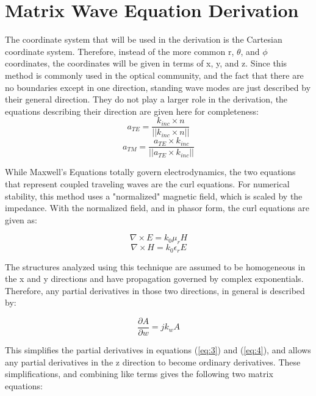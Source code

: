 \section{Matrix Wave Equation Derivation}\label{sec:wave}
The coordinate system that will be used in the derivation is the Cartesian 
coordinate system.  Therefore, instead of the more common r, $\theta$, and 
$\phi$ coordinates, the coordinates will be given in terms of x, y, and z.  
Since this method is commonly used in the optical community, and the fact that 
there are no boundaries except in one direction, standing wave modes are just 
described by their general direction.  They do not play a larger role in the 
derivation, the equations describing their direction are given here for 
completeness:
\begin{equation}
a_{TE} = \frac{k_{inc} \times n}{|| {k_{inc} \times n ||} }
\label{eq:1}
\end{equation}
\begin{equation}
a_{TM} = \frac{ a_{TE} \times k_{inc} } {|| a_{TE} \times k_{inc} || }
\label{eq:2}
\end{equation}

 While Maxwell’s Equations totally govern electrodynamics, the two equations 
 that represent coupled traveling waves are the curl equations.  For numerical 
 stability, this method uses a "normalized" magnetic field, which is scaled by 
 the impedance.  With the normalized field, and in phasor form, the curl 
 equations are given as: 

 \begin{equation}
 \nabla \times E = k_0 \mu_r H
 \label{eq:3}
 \end{equation}
 \begin{equation}
 \nabla \times H = k_0 \epsilon_r E
 \label{eq:4}
 \end{equation}

  The structures analyzed using this technique are assumed to be homogeneous in 
  the x and y directions and have propagation governed by complex exponentials.  
  Therefore, any partial derivatives in those two directions, in general is 
  described by: 

  \begin{equation}
  \frac{\partial A}{\partial w} = j k_w A
  \label{eq:5}
  \end{equation}

   This simplifies the partial derivatives in equations (\ref{eq:3}) and 
   (\ref{eq:4}), and allows any partial derivatives in the z direction to 
   become ordinary derivatives.  These simplifications, and combining like terms 
   gives the following two matrix equations: 

